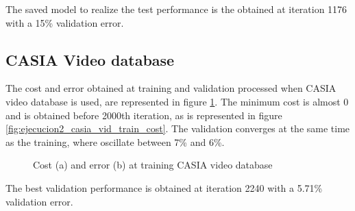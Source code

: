 The saved model to realize the test performance is the obtained at iteration 1176 with a 15\% validation error.\\

\subsection{CASIA Video database}
The cost and error obtained at training and validation processed when CASIA video database is used, are represented in figure \ref{fig:ejecucion2_casia_vid_train}. The minimum cost is almost 0 and is obtained before 2000th iteration, as is represented in figure \ref{fig:ejecucion2_casia_vid_train_cost}. The validation converges at the same time as the training, where oscillate between 7\% and 6\%.\\
\begin{figure}[htb]
\centering
\caption{Cost (a) and error (b) at training CASIA video database}
\label{fig:ejecucion2_casia_vid_train}
\end{figure}

The best validation performance is obtained at iteration 2240 with a 5.71\% validation error.\\


